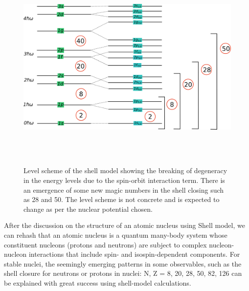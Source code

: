 \begin{figure}[h!]
	\centering
	\includegraphics[width=17cm,height=10.5cm]{figures/shell_model.png}
	\caption[Level scheme of the shell model showing the breaking of degeneracy]{Level scheme of the shell model showing the breaking of degeneracy in the energy levels due to the spin-orbit interaction term. There is an emergence of some new magic numbers in the shell closing such as 28 and 50. The level scheme is not concrete and is expected to change as per the nuclear potential chosen.}
	\label{fig:shell_structure}
\end{figure}
After the discussion on the structure of an atomic nucleus using Shell model, we can rehash that an atomic nucleus is a quantum many-body system whose constituent nucleons (protons and neutrons) are subject to complex nucleon-nucleon interactions that include spin- and isospin-dependent components. For stable nuclei, the seemingly emerging patterns in some observables, such as the shell closure for neutrons or protons in nuclei: N, Z = 8, 20, 28, 50, 82, 126 can be explained with great success using shell-model calculations. 
